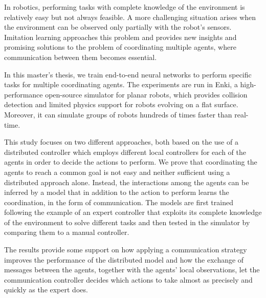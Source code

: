In robotics, performing tasks with complete knowledge of the environment is 
relatively easy but not always feasible. A more challenging situation arises 
when the environment can be observed only partially with the robot's sensors. 
Imitation learning approaches this problem and provides new insights and 
promising solutions to the problem of coordinating multiple agents, where
communication between them becomes essential.

In this master's thesis, we train end-to-end neural networks to perform specific 
tasks for multiple coordinating agents. The experiments are run in Enki, a 
high-performance open-source simulator for planar robots, which provides 
collision detection and limited physics support for robots evolving on a flat 
surface. Moreover, it can simulate groups of robots hundreds of times faster than 
real-time.

This study focuses on two different approaches, both based on the use of a 
distributed controller which employs different local controllers for each of the 
agents in order to decide the actions to perform. 
We prove that coordinating the agents to reach a common goal is not easy and 
neither sufficient using a distributed approach alone. Instead, the interactions 
among the agents can be inferred by a model that in addition to the action to 
perform learns the coordination, in the form of communication. 
The models are first trained following the example of an expert controller that 
exploits its complete knowledge of the environment to solve different tasks and 
then tested in the simulator by comparing them to a manual controller.

The results provide some support on how applying a communication 
strategy improves the performance of the distributed model and how the 
exchange of messages between the agents, together with the agents' local 
observations, let the communication controller decides which actions to take 
almost as precisely and quickly as the expert does.
